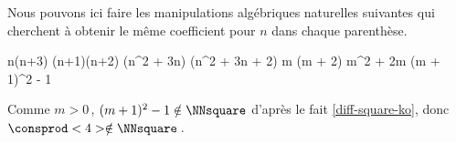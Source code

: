 Nous pouvons ici faire les manipulations algébriques naturelles suivantes qui cherchent à obtenir le même coefficient pour $n$ dans chaque parenthèse.

\medskip

\begin{stepcalc}[style = sar]
\explnext{}
	n(n+3) \cdot (n+1)(n+2)
\explnext{}
	(n^2 + 3n) \cdot (n^2 + 3n + 2)
	m (m + 2)
\explnext{}
	m^2 + 2m
\explnext{}
	(m + 1)^2 - 1
\end{stepcalc}

\medskip

Comme $m > 0$\,, $(m + 1)^2 - 1 \notin \NNsquare$ d'après le fait \ref{diff-square-ko}, donc $\consprod<4> \notin \NNsquare$\,. 